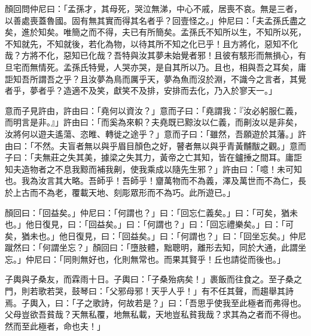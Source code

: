 \begin{pinyinscope}
顏回問仲尼曰：「孟孫才，其母死，哭泣無涕，中心不戚，居喪不哀。無是三者，以善處喪蓋魯國。固有無其實而得其名者乎？回壹怪之。」仲尼曰：「夫孟孫氏盡之矣，進於知矣。唯簡之而不得，夫已有所簡矣。孟孫氏不知所以生，不知所以死，不知就先，不知就後，若化為物，以待其所不知之化已乎！且方將化，惡知不化哉？方將不化，惡知已化哉？吾特與汝其夢未始覺者邪！且彼有駭形而無損心，有旦宅而無情死。孟孫氏特覺，人哭亦哭，是自其所以乃。且也，相與吾之耳矣，庸詎知吾所謂吾之乎？且汝夢為鳥而厲乎天，夢為魚而沒於淵，不識今之言者，其覺者乎，夢者乎？造適不及笑，獻笑不及排，安排而去化，乃入於寥天一。」

意而子見許由，許由曰：「堯何以資汝？」意而子曰：「堯謂我：『汝必躬服仁義，而明言是非。』」許由曰：「而奚為來軹？夫堯既已黥汝以仁義，而劓汝以是非矣，汝將何以遊夫遙蕩、恣睢、轉徙之途乎？」意而子曰：「雖然，吾願遊於其藩。」許由曰：「不然。夫盲者無以與乎眉目顏色之好，瞽者無以與乎青黃黼黻之觀。」意而子曰：「夫無莊之失其美，據梁之失其力，黃帝之亡其知，皆在鑪捶之間耳。庸詎知夫造物者之不息我黥而補我劓，使我乘成以隨先生邪？」許由曰：「噫！未可知也。我為汝言其大略。吾師乎！吾師乎！齏萬物而不為義，澤及萬世而不為仁，長於上古而不為老，覆載天地、刻彫眾形而不為巧。此所遊已。」

顏回曰：「回益矣。」仲尼曰：「何謂也？」曰：「回忘仁義矣。」曰：「可矣，猶未也。」他日復見，曰：「回益矣。」曰：「何謂也？」曰：「回忘禮樂矣。」曰：「可矣，猶未也。」他日復見，曰：「回益矣。」曰：「何謂也？」曰：「回坐忘矣。」仲尼蹴然曰：「何謂坐忘？」顏回曰：「墮肢體，黜聰明，離形去知，同於大通，此謂坐忘。」仲尼曰：「同則無好也，化則無常也。而果其賢乎！丘也請從而後也。」

子輿與子桑友，而霖雨十日。子輿曰：「子桑殆病矣！」裹飯而往食之。至子桑之門，則若歌若哭，鼓琴曰：「父邪母邪！天乎人乎！」有不任其聲，而趨舉其詩焉。子輿入，曰：「子之歌詩，何故若是？」曰：「吾思乎使我至此極者而弗得也。父母豈欲吾貧哉？天無私覆，地無私載，天地豈私貧我哉？求其為之者而不得也。然而至此極者，命也夫！」


\end{pinyinscope}